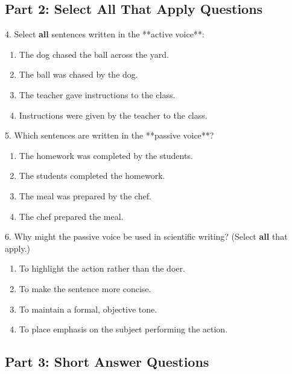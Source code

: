 \documentclass[12pt]{article}
\begin{document}
\vspace{1cm}

\subsection*{Part 2: Select All That Apply Questions}

4. Select \textbf{all} sentences written in the **active voice**:  
\begin{enumerate}[label=\Alph*.]
    \item The dog chased the ball across the yard.  
    \item The ball was chased by the dog.  
    \item The teacher gave instructions to the class.  
    \item Instructions were given by the teacher to the class.  
\end{enumerate}

\vspace{1cm}

5. Which sentences are written in the **passive voice**?  
\begin{enumerate}[label=\Alph*.]
    \item The homework was completed by the students.  
    \item The students completed the homework.  
    \item The meal was prepared by the chef.  
    \item The chef prepared the meal.  
\end{enumerate}

\vspace{1cm}

6. Why might the passive voice be used in scientific writing? (Select \textbf{all} that apply.)  
\begin{enumerate}[label=\Alph*.]
    \item To highlight the action rather than the doer.  
    \item To make the sentence more concise.  
    \item To maintain a formal, objective tone.  
    \item To place emphasis on the subject performing the action.  
\end{enumerate}

\vspace{1cm}
\newpage
\subsection*{Part 3: Short Answer Questions}
\end{document}
